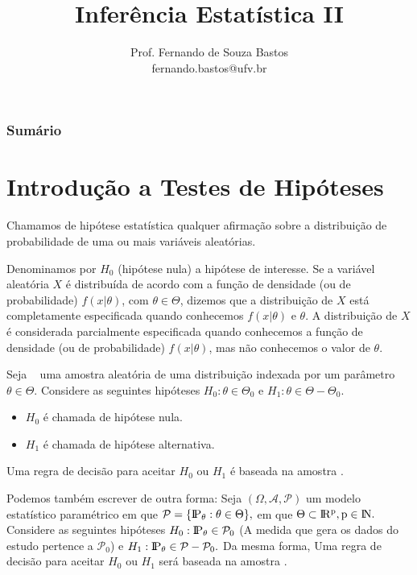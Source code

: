 \documentclass[12pt]{beamer}
\title{Inferência Estatística II}
\author{Prof. Fernando de Souza Bastos\texorpdfstring{\\ fernando.bastos@ufv.br}{}}
\institute{Departamento de Estatística\texorpdfstring{\\ Programa de Pós-Graduação em Estatística Aplicada e Biometria}\texorpdfstring{\\ Universidade Federal de Viçosa}{}\texorpdfstring{\\ Campus UFV - Viçosa}{}}
\date{}
\begin{document}

\frame{\titlepage}

\begin{frame}{}
\frametitle{\bf Sumário}
\tableofcontents
\end{frame}

\section{Introdução a Testes de Hipóteses}
\begin{frame}{}
\begin{definicao}
\justifying
    Chamamos de hipótese estatística qualquer afirmação sobre a distribuição de probabilidade de uma ou mais variáveis aleatórias.
\end{definicao}
\pause
\begin{block}{}
\justifying
Denominamos por \(H_0\) (hipótese nula) a hipótese de interesse. Se a variável aleatória \(X\) é distribuída de acordo com a função de densidade (ou de probabilidade) \(f(x|\theta)\), com \(\theta \in \Theta\), dizemos que a distribuição de \(X\) está completamente especificada quando conhecemos \(f(x|\theta)\) e \(\theta\). A distribuição de \(X\) é considerada parcialmente especificada quando conhecemos a função de densidade (ou de probabilidade) \(f(x|\theta)\), mas não conhecemos o valor de \(\theta\). 

\end{block}
\end{frame}

\begin{frame}{}
\begin{block}{}
\justifying
Seja \seqX~ uma amostra aleatória de uma distribuição indexada por um parâmetro $\theta\in \Theta.$ Considere as seguintes hipóteses $H_{0}:\theta\in \Theta_{0}$ e $H_{1}:\theta\in \Theta-\Theta_{0}.$ 
\begin{itemize}
    \item $H_{0}$ é chamada de hipótese nula.
    \item $H_{1}$ é chamada de hipótese alternativa.
\end{itemize}
Uma regra de decisão para aceitar $H_{0}$ ou $H_{1}$ é baseada na amostra \seqX.
\end{block}
\pause
\begin{block}{}
\justifying
Podemos também escrever de outra forma: Seja $(\Omega, \mathcal{A}, \mathcal{P})$ um modelo estatístico paramétrico em que $\mathcal{P}=\{{\rm I\!P_{\theta}}:\theta\in \Theta \},$ em que $\Theta\subset \rm I\!R^{p}, p\in\rm I\!N.$ Considere as seguintes hipóteses $H_{0}:{\rm I\!P_{\theta}}\in \mathcal{P}_{0}$ (A medida que gera os dados do estudo pertence a $\mathcal{P}_{0}$) e $H_{1}:{\rm I\!P_{\theta}}\in \mathcal{P}-\mathcal{P}_{0}.$ Da mesma forma, Uma regra de decisão para aceitar $H_{0}$ ou $H_{1}$ será baseada na amostra \seqX.
\end{block}
\end{frame}
\end{document}
